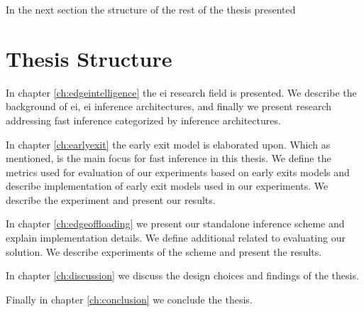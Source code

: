 In the next section the structure of the rest of the thesis presented

\section{Thesis Structure}

In chapter \ref{ch:edgeintelligence} the \gls{ei} research field is presented. We describe the background of \gls{ei}, \gls{ei} inference architectures, and finally we present research addressing fast inference categorized by inference architectures. 

In chapter \ref{ch:earlyexit} the early exit model is elaborated upon. Which as mentioned, is the main focus for fast inference in this thesis. We define the metrics used for evaluation of our experiments based on early exits models and describe implementation of early exit models used in our experiments. We describe the experiment and present our results. 

In chapter \ref{ch:edgeoffloading} we present our standalone inference scheme and explain implementation details. We define additional related to evaluating our solution. We describe experiments of the scheme and present the results. 

In chapter \ref{ch:discussion} we discuss the design choices and findings of the thesis. 

Finally in chapter \ref{ch:conclusion} we conclude the thesis.

%
%

